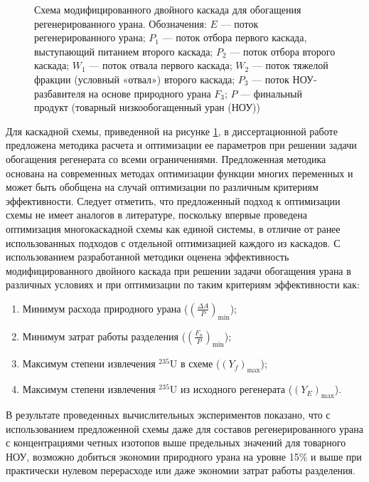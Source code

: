 \begin{figure}[ht]
  \caption{Схема модифицированного двойного каскада для обогащения регенерированного урана. Обозначения: $E$ --- поток регенерированного урана; $P_1$ --- поток отбора первого каскада, выступающий питанием второго каскада; $P_2$ --- поток отбора второго каскада; $W_1$ --- поток отвала первого каскада; $W_2$ --- поток тяжелой фракции (условный «отвал») второго каскада; $P_3$ --- поток НОУ-разбавителя на основе природного урана $F_3$; $P$ --- финальный продукт (товарный низкообогащенный уран (НОУ))}\label{p2left_autoref}
\end{figure}

Для каскадной схемы, приведенной на рисунке \ref{p2left_autoref}, в диссертационной работе предложена методика расчета и оптимизации ее параметров при решении задачи обогащения регенерата со всеми ограничениями. Предложенная методика основана на современных методах оптимизации функции многих переменных и может быть обобщена на случай оптимизации по различным критериям эффективности. Следует отметить, что предложенный подход к оптимизации схемы не имеет аналогов в литературе, поскольку впервые проведена оптимизация многокаскадной схемы как единой системы, в отличие от ранее использованных подходов с отдельной оптимизацией каждого из каскадов. С использованием разработанной методики оценена эффективность модифицированного двойного каскада при решении задачи обогащения урана в различных условиях и при оптимизации по таким критериям эффективности как:

\begin{enumerate}
  \item Минимум расхода природного урана ($(\frac{\Delta A}{P})_\text{min}$);
  \item Минимум затрат работы разделения ($(\frac{F_n}{P})_\text{min}$);
  \item Максимум степени извлечения $^{235}$U в схеме ($(Y_f)_\text{max}$);
  \item Максимум степени извлечения $^{235}$U из исходного регенерата ($(Y_{E})_\text{max}$).
\end{enumerate}  

В результате проведенных вычислительных экспериментов показано, что с использованием предложенной схемы даже для составов регенерированного урана с концентрациями четных изотопов выше предельных значений для товарного НОУ, возможно добиться экономии природного урана на уровне 15\% и выше при практически нулевом перерасходе или даже экономии затрат работы разделения. 


